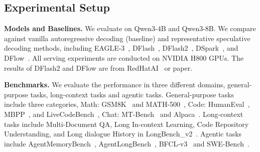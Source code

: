 \subsection{Experimental Setup} \label{sec:exp:setup}



\textbf{Models and Baselines.} We evaluate \we on Qwen3-4B and Qwen3-8B. We compare against vanilla autoregressive decoding (baseline) and representative speculative decoding methods, including EAGLE-3~\cite{li2026eagle3}, DFlash~\cite{chen2026dflash}, DFlash2~\cite{dflash2}, DSpark~\cite{cheng2026dspark}, and DFlow~\cite{zhang2026dflow}. All serving experiments are conducted on NVIDIA H800 GPUs. The results of DFlash2 and DFlow are from RedHatAI~\cite{redhat} or paper.


\textbf{Benchmarks.} We evaluate the performance in three different domains, general-purpose tasks, long-context tasks and agentic tasks. General-purpose tasks include three categories, Math: GSM8K~\cite{gsm8k} and MATH-500~\cite{math500}, Code: HumanEval~\cite{humaneval}, MBPP~\cite{MBPP}, and LiveCodeBench~\cite{jain2025livecodebench}, Chat: MT-Bench~\cite{zheng2023judging} and Alpaca~\cite{alpaca}. Long-context tasks include Multi-Document QA, Long In-context Learning, Code Repository Understanding, and Long dialogue History in LongBench\_v2~\cite{bai2024longbench}. Agentic tasks include AgentMemoryBench~\cite{liu2024agentbench}, AgentLongBench~\cite{fang2026agentlongbenchcontrollablelongbenchmark}, BFCL-v3~\cite{bfcl} and SWE-Bench~\cite{jimenez2024swebench}.


